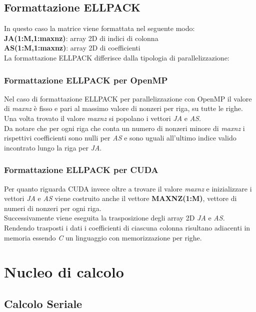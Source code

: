 \documentclass[12pt,halfline,a4paper]{ouparticle}
\begin{document}
\subsection{Formattazione ELLPACK}
\label{sec2.3}

In questo caso la matrice viene formattata nel seguente modo:\\
\textbf{JA(1:M,1:maxnz)}: array 2D di indici di colonna\\
\textbf{AS(1:M,1:maxnz)}: array 2D di coefficienti\\
La formattazione ELLPACK differisce dalla tipologia di parallelizzazione:
\subsubsection{Formattazione ELLPACK per OpenMP}
\label{sec2.3.1}
Nel caso di formattazione ELLPACK per parallelizzazione con OpenMP il valore di \textit{maxnz} è fisso e pari al massimo valore di nonzeri per riga, su tutte le righe. Una volta trovato il valore \textit{maxnz} si popolano i vettori \textit{JA} e \textit{AS}.\\
Da notare che per ogni riga che conta un numero di nonzeri minore di \textit{maxnz} i rispettivi coefficienti sono nulli per \textit{AS} e sono uguali all'ultimo indice valido incontrato lungo la riga per \textit{JA}.\\


\subsubsection{Formattazione ELLPACK per CUDA}
\label{sec2.3.2}
Per quanto riguarda CUDA invece oltre a trovare il valore \textit{maxnz} e inizializzare i vettori \textit{JA} e \textit{AS} viene costruito anche il vettore \textbf{MAXNZ(1:M)}, vettore di numeri di nonzeri per ogni riga.\\
Successivamente viene eseguita la trasposizione degli array 2D \textit{JA} e \textit{AS}. Rendendo trasposti i dati i coefficienti di ciascuna colonna risultano adiacenti in memoria essendo \textit{C} un linguaggio con memorizzazione per righe.\\


\section{Nucleo di calcolo}
\label{sec3}

\subsection{Calcolo Seriale}
\label{sec3.1}
\end{document}
